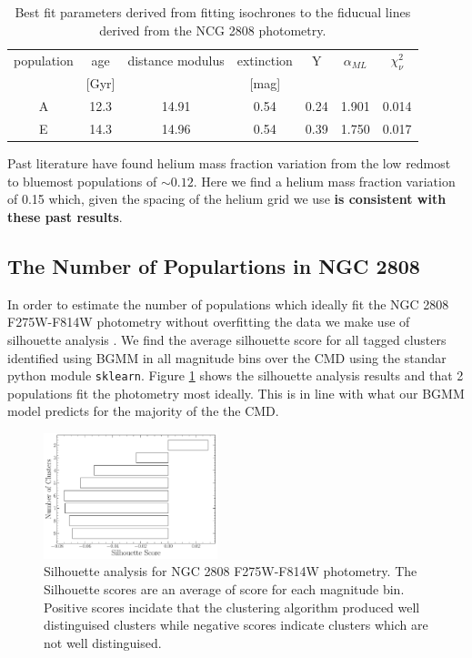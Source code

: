 \begin{table}
  \centering
  \begin{tabular}{c | c c c c c c}
    \hline
    population & age & distance modulus & extinction & Y & $\alpha_{ML}$ & $\chi^{2}_{\nu}$\\
    & [Gyr] & & [mag] & & &\\
    \hline
    \hline
    A & 12.3 & 14.91 & 0.54 & 0.24 & 1.901 & 0.014\\
    E & 14.3 & 14.96 & 0.54 & 0.39 & 1.750 & 0.017 \\
    \hline
  \end{tabular}
  \label{tab:BestFitResults}
  \caption{Best fit parameters derived from fitting isochrones to the fiducual lines derived from the NCG 2808 photometry.}
\end{table}


Past literature \citep[e.g. ][]{Milone2015, Milone2018} have found helium mass fraction variation from the low redmost to bluemost populations of $\sim 0.12$. Here we find a helium mass fraction variation of 0.15 which, given the spacing of the helium grid we use \textbf{is consistent with these past results}.

\subsection{The Number of Populartions in NGC 2808}
In order to estimate the number of populations which ideally fit the NGC 2808
F275W-F814W photometry without overfitting the data we make use of silhouette
analysis \citep[][and in a similar manner to how \citet{Valle2022}
preform their analysis of spectroscopic data]{ROUSSEEUW198753}. We find the average silhouette score for all tagged
clusters identified using BGMM in all magnitude bins over the CMD using the
standar python module \texttt{sklearn}. Figure \ref{fig:clusterAn} shows the
silhouette analysis results and that 2 populations fit the photometry most
ideally. This is in line with what our BGMM model predicts for the majority of
the the CMD.

\begin{figure}
  \centering
  \includegraphics[width=0.45\textwidth]{src/figures/ClusterAnalysis.pdf}
  \caption{Silhouette analysis for NGC 2808 F275W-F814W photometry. The Silhouette scores
  are an average of score for each magnitude bin. Positive scores incidate that the clustering
  algorithm produced well distinguised clusters while negative scores indicate clusters which are not
  well distinguised.}
  \label{fig:clusterAn}
\end{figure}


